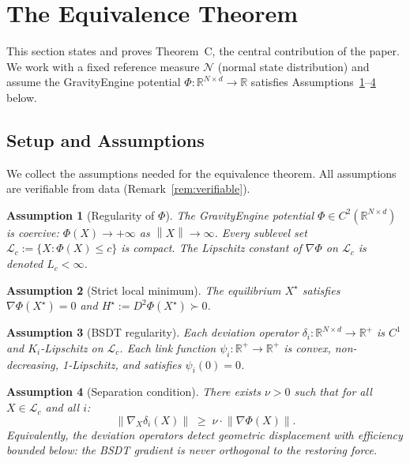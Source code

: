 \documentclass[11pt]{article}
\newtheorem{assumption}{Assumption}
\theoremstyle{definition}
\newcommand{\R}{\mathbb{R}}
\newcommand{\Xst}{X^{\star}}
\newcommand{\grad}{\nabla}
\newcommand{\norm}[1]{\left\|#1\right\|}
\begin{document}

\section{The Equivalence Theorem}
\label{sec:equiv}

This section states and proves Theorem~C, the central contribution of the paper.
We work with a fixed reference measure $\mathcal{N}$ (normal state distribution)
and assume the GravityEngine potential $\Phi : \R^{N\times d}\to\R$ satisfies
Assumptions~\ref{ass:reg}--\ref{ass:sep} below.

\subsection{Setup and Assumptions}
\label{sec:equiv:setup}

We collect the assumptions needed for the equivalence theorem.  All assumptions
are verifiable from data (Remark~\ref{rem:verifiable}).

\begin{assumption}[Regularity of $\Phi$]
\label{ass:reg}
The GravityEngine potential $\Phi \in C^2(\R^{N\times d})$ is coercive:
$\Phi(X)\to+\infty$ as $\norm{X}\to\infty$.  Every sublevel set
$\mathcal{L}_c := \{X : \Phi(X)\le c\}$ is compact.
The Lipschitz constant of $\grad\Phi$ on $\mathcal{L}_c$ is denoted $L_c < \infty$.
\end{assumption}

\begin{assumption}[Strict local minimum]
\label{ass:equil}
The equilibrium $\Xst$ satisfies $\grad\Phi(\Xst)=0$ and
$H^\star := D^2\Phi(\Xst) \succ 0$.
\end{assumption}

\begin{assumption}[BSDT regularity]
\label{ass:bsdt}
Each deviation operator $\delta_i : \R^{N\times d}\to\R^+$ is $C^1$ and
$K_i$-Lipschitz on $\mathcal{L}_c$.  Each link function $\psi_i : \R^+\to\R^+$
is convex, non-decreasing, 1-Lipschitz, and satisfies $\psi_i(0)=0$.
\end{assumption}

\begin{assumption}[Separation condition]
\label{ass:sep}
There exists $\nu > 0$ such that for all $X\in\mathcal{L}_c$ and all $i$:
\[
  \norm{\grad_X \delta_i(X)} \;\ge\; \nu \cdot \norm{\grad\Phi(X)}.
\]
Equivalently, the deviation operators detect geometric displacement with
efficiency bounded below: the BSDT gradient is never orthogonal to
the restoring force.
\end{assumption}
\end{document}
